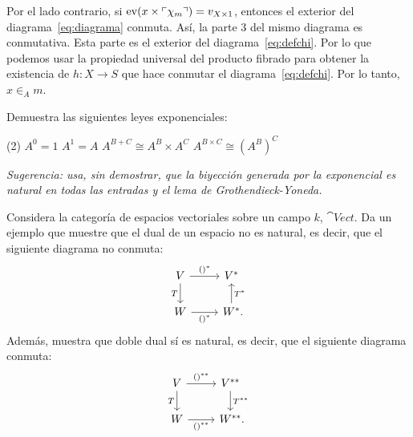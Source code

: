 \begin{solution}[print=true]
  Por el lado contrario, si \(\mathrm{ev}(x\times\ulcorner\chi_m\urcorner)=v_{X\times 1}\),
  entonces el exterior del diagrama~\ref{eq:diagrama} conmuta. Así, la parte 3
  del mismo diagrama es conmutativa. Esta parte es el exterior del
  diagrama~\ref{eq:defchi}. Por lo que podemos usar la propiedad universal del
  producto fibrado para obtener la existencia de \(h\colon X\to S\) que hace
  conmutar el diagrama~\ref{eq:defchi}. Por lo tanto, \(x\in_A m\). 
\end{solution}

\begin{exercise}[par=2]
  Demuestra las siguientes leyes exponenciales:
  \begin{tasks}(2)
    \task \(A^0=1\)
    \task \(A^1=A\)
    \task \(A^{B+C}\cong A^B\times A^C\)
    \task \(A^{B\times C}\cong (A^B)^C\)
  \end{tasks}
  \textit{Sugerencia: usa, sin demostrar, que la biyección generada por la exponencial es natural en todas las entradas y el lema de Grothendieck-Yoneda.}
\end{exercise}

\begin{exercise}[par=2]
  Considera la categoría de espacios vectoriales sobre un campo \(k\),
  \(\cat{Vect}\). Da un ejemplo que muestre que el dual de un espacio no es
  natural, es decir, que el siguiente diagrama no conmuta:
  \begin{equation*}
    \begin{tikzcd}[ampersand replacement=\&]
      V\ar{r}{()^*}\ar{d}[swap]{T} \& V^*\\
      W\ar{r}[swap]{()^*} \& W^*\mathrlap{.}\ar{u}[swap]{T^*}     
    \end{tikzcd}
  \end{equation*}
  Además, muestra que doble dual sí es natural, es decir, que el
  siguiente diagrama conmuta:
  \begin{equation*}
    \begin{tikzcd}[ampersand replacement=\&]
      V\ar{r}{()^{**}}\ar{d}[swap]{T} \& V^{**}\ar{d}{T^{**}}\\
      W\ar{r}[swap]{()^{**}} \& W^{**}\mathrlap{.}
    \end{tikzcd}
  \end{equation*}
\end{exercise}